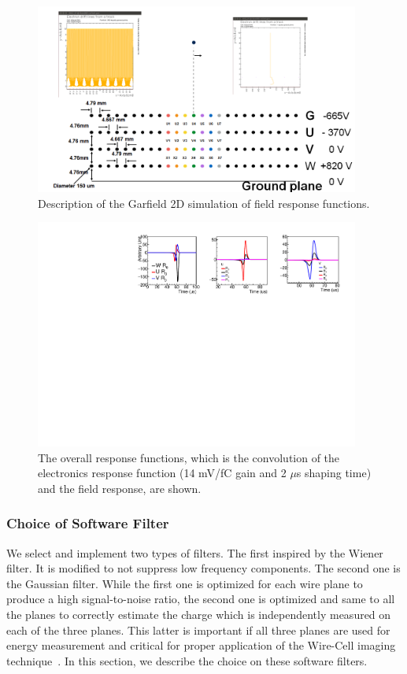 \begin{figure}[htb]
\centering
\includegraphics[width=0.95\textwidth]{figures/Garfield_simu.png}
\caption{Description of the Garfield 2D simulation of field response functions.}
\label{fig:garfield_2d}
\end{figure}

\begin{figure}[htb]
\centering
\includegraphics[width=0.95\textwidth]{figures/dune_field_res.pdf}
\caption{The overall response functions, which is the convolution of the
electronics response function (14 mV/fC gain and 2 $\mu$s shaping time) 
and the field response, are shown. }
\label{fig:overall_response}
\end{figure}


\subsubsection{Choice of Software Filter}

We select and implement two types of filters.  The first inspired by the Wiener filter.  It is modified to not suppress
low frequency components.  The second one is the Gaussian filter. While the first one is optimized for 
each wire plane to produce a high signal-to-noise ratio, the second one is optimized and same to all the planes 
to correctly estimate the charge which is independently measured on each of the three planes.  This latter is 
important if all three planes are used for energy measurement and critical for proper application of the
Wire-Cell imaging technique~\cite{wire-cell}.  In this section, we describe the choice on these software filters.

